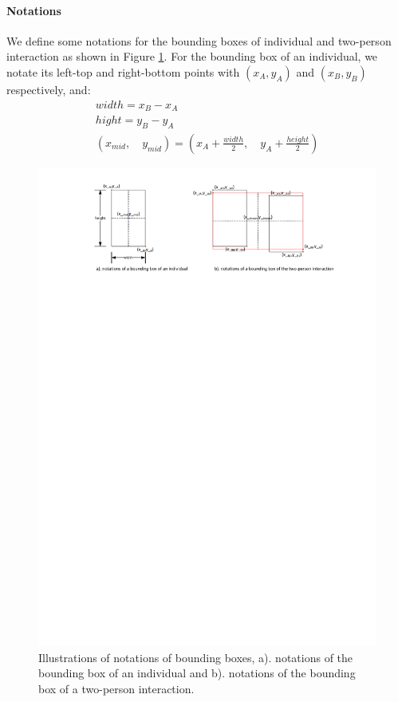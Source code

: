 \paragraph*{Notations}
We define some notations for the bounding boxes of individual and two-person interaction as shown in Figure \ref{fig:bb_notations}. For the bounding box of an individual, we notate its left-top and right-bottom points  with \((x_A,y_A)\) and \((x_B,y_B)\) respectively, and:
\begin{eqnarray}
	width = x_B - x_A \\
	hight = y_B - y_A \\
	(x_{mid}, \quad y_{mid}) = (x_A + \frac{width}{2},\quad y_A + \frac{height}{2})
\end{eqnarray}
\begin{figure}
	\includegraphics[trim=2cm 23cm 0cm 1cm]{fig01/bb_notations.pdf}
	\caption{Illustrations of notations of bounding boxes, a). notations of the bounding box of an individual and b). notations of the bounding box of a two-person interaction.}
	\label{fig:bb_notations}
\end{figure}
